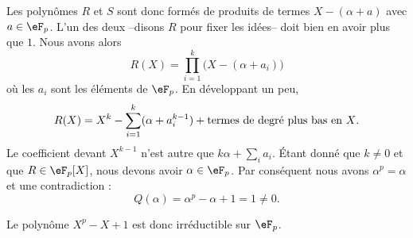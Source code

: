 \begin{example}
    Les polynômes \( R\) et \( S\) sont donc formés de produits de termes \( X-(\alpha+a)\) avec \( a\in \eF_p\). L'un des deux --disons \( R\) pour fixer les idées-- doit bien en avoir plus que \( 1\). Nous avons alors
    \begin{equation}
        R(X)=\prod_{i=1}^{k}\big( X-(\alpha+a_i) \big)
    \end{equation}
    où les \( a_i\) sont les éléments de \( \eF_p\). En développant un peu,
    \begin{equation}
        R(X)=X^k-\sum_{i=1}^k(\alpha+a_i^{k-1})+\text{termes de degré plus bas en \( X\)}.
    \end{equation}
    Le coefficient devant \( X^{k-1}\) n'est autre que \( k\alpha+\sum_ia_i\). Étant donné que \( k\neq 0\) et que \( R\in \eF_p[X]\), nous devons avoir \( \alpha\in \eF_p\). Par conséquent nous avons \( \alpha^p=\alpha\) et une contradiction :
    \begin{equation}
        Q(\alpha)=\alpha^p-\alpha+1=1\neq 0.
    \end{equation}

    Le polynôme \( X^p-X+1\) est donc irréductible sur \( \eF_p\).
\end{example}
